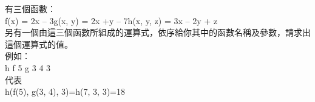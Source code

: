 有三個函數：\\
f(x) = 2x – 3g(x, y) = 2x +y – 7h(x, y, z) = 3x – 2y + z\\
另有一個由這三個函數所組成的運算式，依序給你其中的函數名稱及參數，請求出這個運算式的值。\\
例如：\\
h f 5 g 3 4 3\\
代表\\
h(f(5), g(3, 4), 3)=h(7, 3, 3)=18